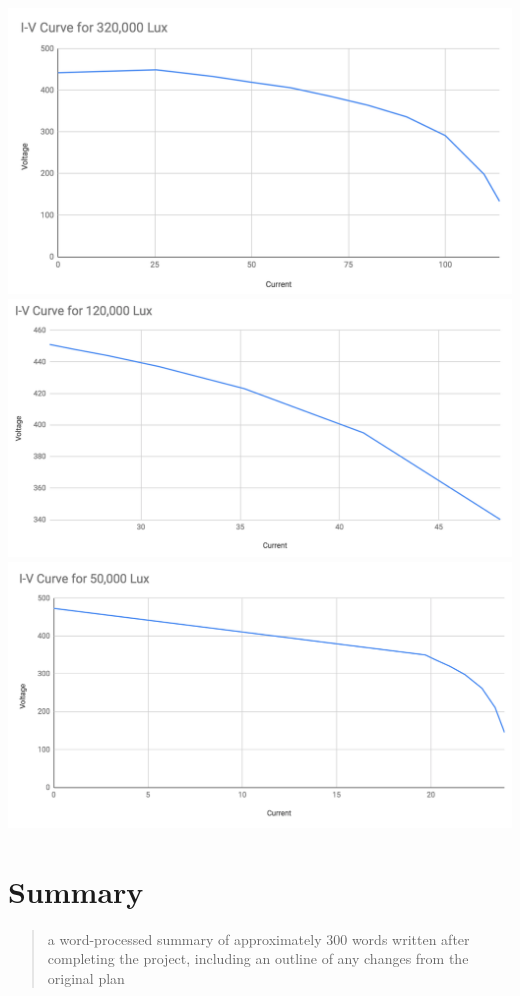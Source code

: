 \documentclass{article}
\begin{document}
\includegraphics[scale=0.3]{ivcurve1}
\\
\includegraphics[scale=0.4]{ivcurve2}
\\
\includegraphics[scale=0.4]{ivcurve3}

\section{Summary}
\begin{quote}
  a word-processed summary of approximately 300 words written after completing the project, including an outline of any changes from the original plan
\end{quote}
\end{document}
